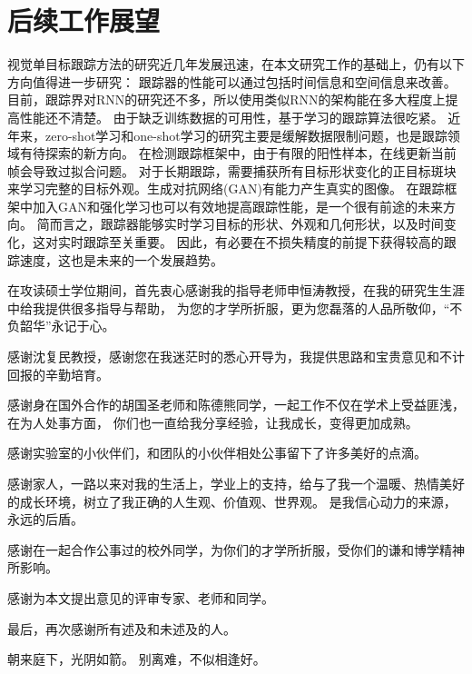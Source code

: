 \documentclass[promaster]{thesis-uestc}
\begin{document}
\section{后续工作展望}
视觉单目标跟踪方法的研究近几年发展迅速，在本文研究工作的基础上，仍有以下方向值得进一步研究：
跟踪器的性能可以通过包括时间信息和空间信息来改善。
目前，跟踪界对RNN的研究还不多，所以使用类似RNN的架构能在多大程度上提高性能还不清楚。
由于缺乏训练数据的可用性，基于学习的跟踪算法很吃紧。
近年来，zero-shot学习和one-shot学习的研究主要是缓解数据限制问题，也是跟踪领域有待探索的新方向。
在检测跟踪框架中，由于有限的阳性样本，在线更新当前帧会导致过拟合问题。
对于长期跟踪，需要捕获所有目标形状变化的正目标斑块来学习完整的目标外观。生成对抗网络(GAN)有能力产生真实的图像。
在跟踪框架中加入GAN和强化学习也可以有效地提高跟踪性能，是一个很有前途的未来方向。
简而言之，跟踪器能够实时学习目标的形状、外观和几何形状，以及时间变化，这对实时跟踪至关重要。
因此，有必要在不损失精度的前提下获得较高的跟踪速度，这也是未来的一个发展趋势。

\thesisacknowledgement
在攻读硕士学位期间，首先衷心感谢我的指导老师申恒涛教授，在我的研究生生涯中给我提供很多指导与帮助，
为您的才学所折服，更为您磊落的人品所敬仰，“不负韶华”永记于心。

感谢沈复民教授，感谢您在我迷茫时的悉心开导为，我提供思路和宝贵意见和不计回报的辛勤培育。

感谢身在国外合作的胡国圣老师和陈德熊同学，一起工作不仅在学术上受益匪浅，在为人处事方面，
你们也一直给我分享经验，让我成长，变得更加成熟。

感谢实验室的小伙伴们，和团队的小伙伴相处公事留下了许多美好的点滴。

感谢家人，一路以来对我的生活上，学业上的支持，给与了我一个温暖、热情美好的成长环境，树立了我正确的人生观、价值观、世界观。
是我信心动力的来源，永远的后盾。

感谢在一起合作公事过的校外同学，为你们的才学所折服，受你们的谦和博学精神所影响。

感谢为本文提出意见的评审专家、老师和同学。

最后，再次感谢所有述及和未述及的人。

朝来庭下，光阴如箭。
别离难，不似相逢好。

\thesisappendix


\end{document}
